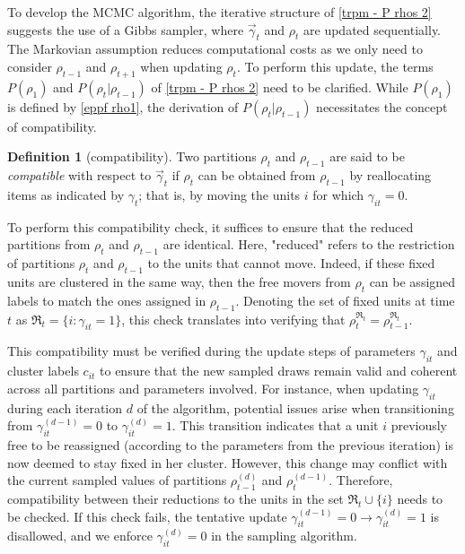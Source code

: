 \documentclass[12pt,	%
	a4paper,		%
	twoside,		%
	openright,		%
	titlepage,%
	]{book}
\theoremstyle{definition}
\newtheorem{definition}{Definition}[chapter]
\begin{document}
To develop the MCMC algorithm, the iterative structure of \eqref{trpm - P rhos 2} suggests the use of a Gibbs sampler, where $\vec{\gamma}_t$ and $\rho_t$ are updated sequentially. The Markovian assumption reduces computational costs as we only need to consider $\rho_{t-1}$ and $\rho_{t+1}$ when updating $\rho_{t}$. To perform this update, the terms $P(\rho_1)$ and $P(\rho_t|\rho_{t-1})$ of \eqref{trpm - P rhos 2} need to be clarified. While $P(\rho_1)$ is defined by \eqref{eppf rho1}, the derivation of $P(\rho_t|\rho_{t-1})$ necessitates the concept of compatibility.
\begin{definition}[compatibility]
Two partitions $\rho_t$ and $\rho_{t-1}$ are said to be \textit{compatible} with respect to $\vec{\gamma}_t$ if $\rho_t$ can be obtained from $\rho_{t-1}$ by reallocating items as indicated by $\gamma_t$; that is, by moving the units $i$ for which $\gamma_{it}=0$. 
\end{definition}
To perform this compatibility check, it suffices to ensure that the reduced partitions from $\rho_t$ and $\rho_{t-1}$ are identical. Here, "reduced" refers to the restriction of partitions $\rho_t$ and $\rho_{t-1}$ to the units that cannot move. Indeed, if these fixed units are clustered in the same way, then the free movers from $\rho_{t}$ can be assigned labels to match the ones assigned in $\rho_{t-1}$. Denoting the set of fixed units at time $t$ as $\mathfrak{R}_t= \{ i : \gamma_{it}=1\}$,  this check translates into verifying that $\rho_t^{\mathfrak{R}_t} = \rho_{t-1}^{\mathfrak{R}_t}$.

This compatibility must be verified during the update steps of parameters $\gamma_{it}$ and cluster labels $c_{it}$ to ensure that the new sampled draws remain valid and coherent across all partitions and parameters involved. For instance, when updating $\gamma_{it}$ during each iteration $d$ of the algorithm, potential issues arise when transitioning from $\gamma_{it}^{(d-1)}=0$ to $\gamma_{it}^{(d)}=1$. This transition indicates that a unit $i$ previously free to be reassigned (according to the parameters from the previous iteration) is now deemed to stay fixed in her cluster. However, this change may conflict with the current sampled values of partitions $\rho_{t-1}^{(d)}$ and $\rho_t^{(d-1)}$. Therefore, compatibility between their reductions to the units in the set $\mathfrak{R}_t \cup \{i\}$ needs to be checked. If this check fails, the tentative update $\gamma_{it}^{(d-1)}=0 \to \gamma_{it}^{(d)}=1$ is disallowed, and we enforce $\gamma_{it}^{(d)}=0$ in the sampling algorithm. 
\end{document}
